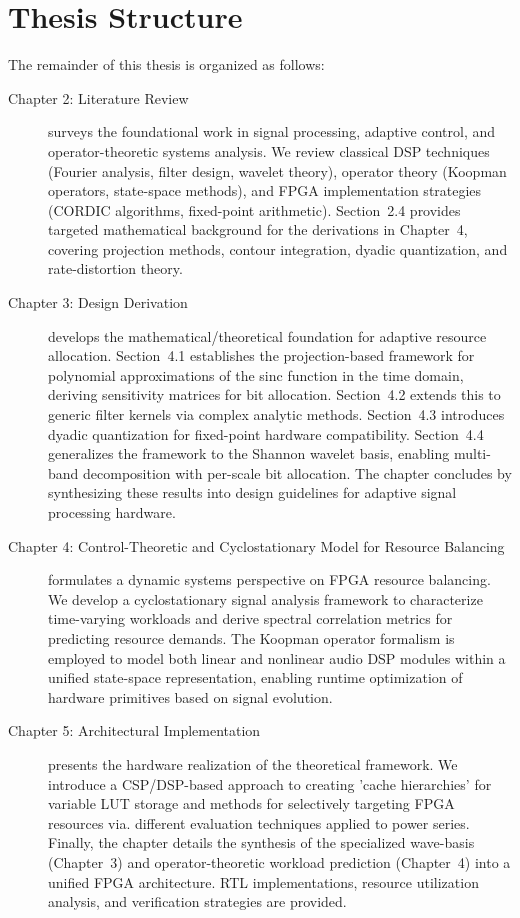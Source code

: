 \section{Thesis Structure}

The remainder of this thesis is organized as follows:

\begin{description}
\item[Chapter 2: Literature Review] surveys the foundational work in signal processing, adaptive control, and operator-theoretic systems analysis. We review classical DSP techniques (Fourier analysis, filter design, wavelet theory), operator theory (Koopman operators, state-space methods), and FPGA implementation strategies (CORDIC algorithms, fixed-point arithmetic). Section~2.4 provides targeted mathematical background for the derivations in Chapter~4, covering projection methods, contour integration, dyadic quantization, and rate-distortion theory.

\item[Chapter 3: Design Derivation] develops the mathematical/theoretical foundation for adaptive resource allocation. Section~4.1 establishes the projection-based framework for polynomial approximations of the sinc function in the time domain, deriving sensitivity matrices for bit allocation. Section~4.2 extends this to generic filter kernels via complex analytic methods. Section~4.3 introduces dyadic quantization for fixed-point hardware compatibility. Section~4.4 generalizes the framework to the Shannon wavelet basis, enabling multi-band decomposition with per-scale bit allocation. The chapter concludes by synthesizing these results into design guidelines for adaptive signal processing hardware.

\item[Chapter 4: Control-Theoretic and Cyclostationary Model for Resource Balancing] formulates a dynamic systems perspective on FPGA resource balancing. We develop a cyclostationary signal analysis framework to characterize time-varying workloads and derive spectral correlation metrics for predicting resource demands. The Koopman operator formalism is employed to model both linear and nonlinear audio DSP modules within a unified state-space representation, enabling runtime optimization of hardware primitives based on signal evolution.

\item[Chapter 5: Architectural Implementation] presents the hardware realization of the theoretical framework. We introduce a CSP/DSP-based approach to creating 'cache hierarchies' for variable LUT storage and methods for selectively targeting FPGA resources via. different evaluation techniques applied to power series. Finally, the chapter details the synthesis of the specialized wave-basis (Chapter~3) and operator-theoretic workload prediction (Chapter~4) into a unified FPGA architecture. RTL implementations, resource utilization analysis, and verification strategies are provided.


\end{description}
